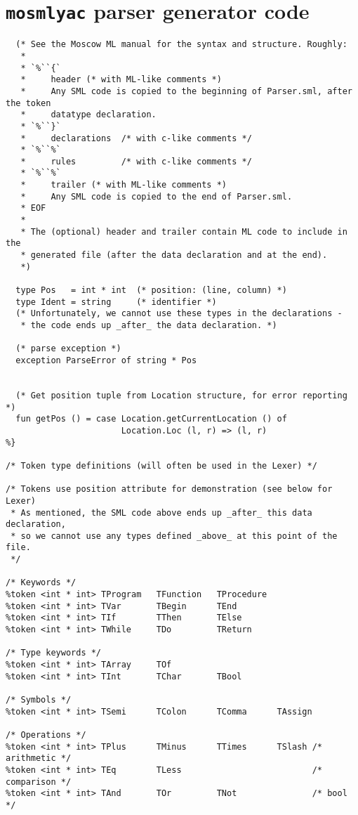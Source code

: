 \section{\texttt{mosmlyac} parser generator code} \label{app:grm}
\begin{lstlisting}[style=MLStyle]
%{
  (* See the Moscow ML manual for the syntax and structure. Roughly:
   *
   * `%``{`
   *     header (* with ML-like comments *)
   *     Any SML code is copied to the beginning of Parser.sml, after the token
   *     datatype declaration.
   * `%``}`
   *     declarations  /* with c-like comments */
   * `%``%`
   *     rules         /* with c-like comments */
   * `%``%`
   *     trailer (* with ML-like comments *)
   *     Any SML code is copied to the end of Parser.sml.
   * EOF
   *
   * The (optional) header and trailer contain ML code to include in the
   * generated file (after the data declaration and at the end).
   *)

  type Pos   = int * int  (* position: (line, column) *)
  type Ident = string     (* identifier *)
  (* Unfortunately, we cannot use these types in the declarations -
   * the code ends up _after_ the data declaration. *)

  (* parse exception *)
  exception ParseError of string * Pos


  (* Get position tuple from Location structure, for error reporting *)
  fun getPos () = case Location.getCurrentLocation () of
                       Location.Loc (l, r) => (l, r)
%}

/* Token type definitions (will often be used in the Lexer) */

/* Tokens use position attribute for demonstration (see below for Lexer)
 * As mentioned, the SML code above ends up _after_ this data declaration,
 * so we cannot use any types defined _above_ at this point of the file.
 */

/* Keywords */
%token <int * int> TProgram   TFunction   TProcedure
%token <int * int> TVar       TBegin      TEnd
%token <int * int> TIf        TThen       TElse
%token <int * int> TWhile     TDo         TReturn

/* Type keywords */
%token <int * int> TArray     TOf
%token <int * int> TInt       TChar       TBool

/* Symbols */
%token <int * int> TSemi      TColon      TComma      TAssign

/* Operations */
%token <int * int> TPlus      TMinus      TTimes      TSlash /* arithmetic */
%token <int * int> TEq        TLess                          /* comparison */
%token <int * int> TAnd       TOr         TNot               /* bool */


\end{lstlisting}

